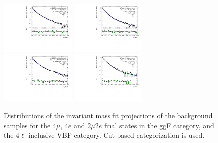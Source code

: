 \begin{figure}[htbp]
    \centering
    \includegraphics[width=0.32\textwidth]{figures/HMHZZ/background/cut_based/bkg_shape_qqZZ_ggF_4mu_190_to_2200_log.pdf}
    \includegraphics[width=0.32\textwidth]{figures/HMHZZ/background/cut_based/bkg_shape_qqZZ_ggF_4e_190_to_2200_log.pdf} \\
    \includegraphics[width=0.32\textwidth]{figures/HMHZZ/background/cut_based/bkg_shape_qqZZ_ggF_2mu2e_190_to_2200_log.pdf}
    \includegraphics[width=0.32\textwidth]{figures/HMHZZ/background/cut_based/bkg_shape_qqZZ_VBF_incl_190_to_2200_log.pdf}
    \caption{Distributions of the \mfl invariant mass fit projections of the \qqZZ background samples for the $4\mu$,
    $4e$ and $2\mu 2e$ final states in the ggF category, and the $4\ell$ inclusive VBF category.
    Cut-based categorization is used.} 
    \label{fig:qqZZ_m4l_shape_all_cut_based}
\end{figure}

